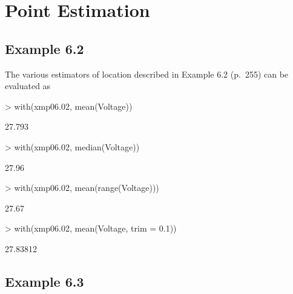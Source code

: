 \documentclass{book}
\begin{document}
\chapter{Point Estimation}
\label{cha:PointEst}


\section{Example 6.2}
\label{sec:xmp0602}
The various estimators of location described in Example 6.2 (p.~255)
can be evaluated as
\begin{Schunk}
\begin{Sinput}
> with(xmp06.02, mean(Voltage))
\end{Sinput}
\begin{Soutput}
[1] 27.793
\end{Soutput}
\begin{Sinput}
> with(xmp06.02, median(Voltage))
\end{Sinput}
\begin{Soutput}
[1] 27.96
\end{Soutput}
\begin{Sinput}
> with(xmp06.02, mean(range(Voltage)))
\end{Sinput}
\begin{Soutput}
[1] 27.67
\end{Soutput}
\begin{Sinput}
> with(xmp06.02, mean(Voltage, trim = 0.1))
\end{Sinput}
\begin{Soutput}
[1] 27.83812
\end{Soutput}
\end{Schunk}

\section{Example 6.3}
\label{sec:xmp0603}
\end{document}
